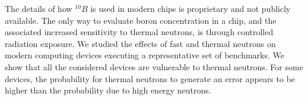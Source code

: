 The details of how  $^{10}B$ is used in modern chips is proprietary and not publicly available. The only way to evaluate boron concentration in a chip, and the associated increased sensitivity to thermal neutrons, is through controlled radiation exposure. We studied the effects of fast and thermal neutrons on modern computing devices executing a representative set of benchmarks.
We show that all the considered devices are vulnerable to thermal neutrons. For some devices, the probability for thermal neutrons to generate an error appears to be higher than the probability due to high energy neutrons.  




